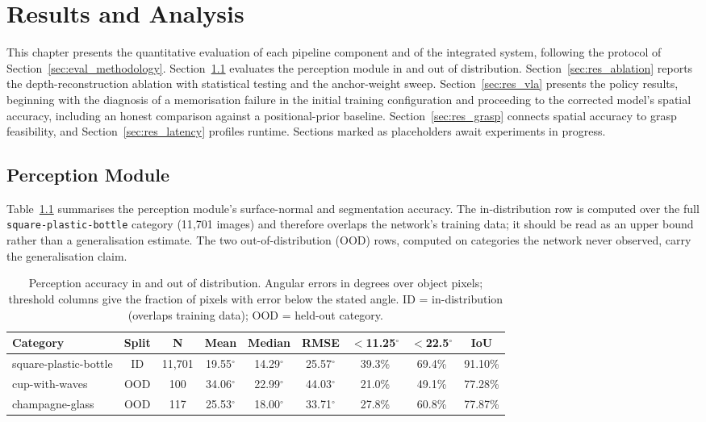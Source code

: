 \chapter{Results and Analysis}
\label{ch:results}

This chapter presents the quantitative evaluation of each pipeline component and of the integrated system, following the protocol of Section~\ref{sec:eval_methodology}. Section~\ref{sec:res_perception} evaluates the perception module in and out of distribution. Section~\ref{sec:res_ablation} reports the depth-reconstruction ablation with statistical testing and the anchor-weight sweep. Section~\ref{sec:res_vla} presents the policy results, beginning with the diagnosis of a memorisation failure in the initial training configuration and proceeding to the corrected model's spatial accuracy, including an honest comparison against a positional-prior baseline. Section~\ref{sec:res_grasp} connects spatial accuracy to grasp feasibility, and Section~\ref{sec:res_latency} profiles runtime. Sections marked as placeholders await experiments in progress.

\section{Perception Module}
\label{sec:res_perception}

Table~\ref{tab:perception_results} summarises the perception module's surface-normal and segmentation accuracy. The in-distribution row is computed over the full \texttt{square-plastic-bottle} category (11{,}701 images) and therefore overlaps the network's training data; it should be read as an upper bound rather than a generalisation estimate. The two out-of-distribution (OOD) rows, computed on categories the network never observed, carry the generalisation claim.

\begin{table}[htbp]
    \centering
    \caption{Perception accuracy in and out of distribution. Angular errors in degrees over object pixels; threshold columns give the fraction of pixels with error below the stated angle. ID = in-distribution (overlaps training data); OOD = held-out category.}
    \label{tab:perception_results}
    \begin{tabular}{lcccccccc}
        \toprule
        \textbf{Category} & \textbf{Split} & \textbf{N} & \textbf{Mean} & \textbf{Median} & \textbf{RMSE} & \textbf{$<$11.25$^{\circ}$} & \textbf{$<$22.5$^{\circ}$} & \textbf{IoU} \\
        \midrule
        square-plastic-bottle & ID & 11{,}701 & 19.55$^{\circ}$ & 14.29$^{\circ}$ & 25.57$^{\circ}$ & 39.3\% & 69.4\% & 91.10\% \\
        cup-with-waves & OOD & 100 & 34.06$^{\circ}$ & 22.99$^{\circ}$ & 44.03$^{\circ}$ & 21.0\% & 49.1\% & 77.28\% \\
        champagne-glass & OOD & 117 & 25.53$^{\circ}$ & 18.00$^{\circ}$ & 33.71$^{\circ}$ & 27.8\% & 60.8\% & 77.87\% \\
        \bottomrule
    \end{tabular}
\end{table}

